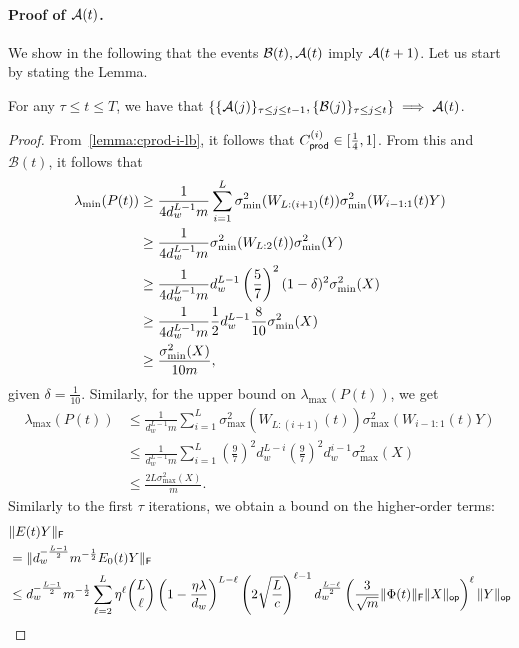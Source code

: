 \paragraph{Proof of $\mathcal{A}(t)$.} We show in the following that the events $\mathcal{B}(t), \mathcal{A}(t)$ imply $\mathcal{A}(t+1)$. Let us start by stating the Lemma.
\begin{lemma}
  For any $\tau \leq t \leq T$, we have that $\{\{\mathcal{A}(j)\}_{\tau \leq j \leq t-1}, \{\mathcal{B}(j)\}_{\tau \leq j \leq t}\} \implies \mathcal{A}(t)$.
\end{lemma}
\begin{proof}
From~\cref{lemma:cprod-i-lb}, it follows that $C_{\mathsf{prod}}^{({i})} \in [\frac{1}{4}, 1]$. From this and $\mathcal{B}(t)$, it follows that
\begin{align*}
    \lambda_{\min}(P(t)) &\geq \frac{1}{4 d_w^{L-1}m} \sum_{i=1}^L  \sigma^2_{\min}(W_{L:(i+1)}(t)) \sigma^2_{\min}(W_{i-1:1}(t)Y)  \\
    &\geq \frac{1}{4 d_w^{L-1}m}  \sigma^2_{\min}(W_{L:2}(t)) \sigma^2_{\min}(Y)\\
    &\geq \frac{1}{4 d_w^{L-1}m}  d_w^{L-1} \left(\frac{5}{7}\right)^2 (1-\delta)^2 \sigma_{\min}^2(X)\\
    &\geq  \frac{1}{4 d_w^{L-1}m}  \frac{1}{2} d_w^{L-1} \frac{8}{10} \sigma_{\min}^2(X)\\
    &\geq \frac{ \sigma_{\min}^2(X) }{10 m},
\end{align*}
given $\delta = \frac{1}{10}$.
Similarly, for the upper bound on $\lambda_{\max}(P(t))$, we get
\begin{align*}
    \lambda_{\max}(P(t)) &\leq \frac{1}{d_w^{L-1}m} \sum_{i=1}^L \sigma^2_{\max}(W_{L:(i+1)}(t)) \sigma^2_{\max}(W_{i-1:1}(t)Y)  \\
    &\leq \frac{1}{d_w^{L-1}m} \sum_{i=1}^L \left(\frac{9}{7}\right)^2 d_w^{L-i} \left(\frac{9}{7}\right)^2 d_w^{i-1} \sigma_{\max}^2(X)\\ 
    &\leq \frac{2 L  \sigma_{\max}^2(X) }{m}.
\end{align*}
Similarly to the first $\tau$ iterations, we obtain a bound on the higher-order terms:
\begin{align*}
    & \frobnorm{E(t)Y} \\
    &= \frobnorm{d_w^{-\frac{L-1}{2}}m^{-\frac{1}{2}}E_0(t)Y} \\
    & \leq d_w^{-\frac{L-1}{2}}m^{-\frac{1}{2}} \sum_{\ell=2}^L \eta^{\ell} \binom{L}{\ell} \left(1-\frac{\eta \lambda}{d_w}\right)^{L-\ell} \left(2 \sqrt{\frac{L}{c}} \right)^{\ell -1} d_w^{\frac{L-\ell}{2}} \left(\frac{3}{ \sqrt{m}}\frobnorm{\Phi(t)}\opnorm{X} \right)^{\ell} \opnorm{Y}\\

\end{align*}
\end{proof}
